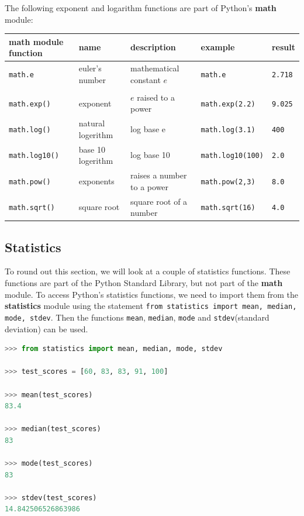 \documentclass{book}
\begin{document}
The following exponent and logarithm functions are part of Python's
\textbf{math} module:

\begin{longtable}[]{@{}lllll@{}}
\toprule
math module function & name & description & example &
result\tabularnewline
\midrule
\endhead
\lstinline!math.e! & euler's number & mathematical constant \(e\) &
\lstinline!math.e! & \lstinline!2.718!\tabularnewline
& & & &\tabularnewline
\lstinline!math.exp()! & exponent & \(e\) raised to a power &
\lstinline!math.exp(2.2)! & \lstinline!9.025!\tabularnewline
\lstinline!math.log()! & natural logerithm & log base e &
\lstinline!math.log(3.1)! & \lstinline!400!\tabularnewline
\lstinline!math.log10()! & base 10 logerithm & log base 10 &
\lstinline!math.log10(100)! & \lstinline!2.0!\tabularnewline
\lstinline!math.pow()! & exponents & raises a number to a power &
\lstinline!math.pow(2,3)! & \lstinline!8.0!\tabularnewline
\lstinline!math.sqrt()! & square root & square root of a number &
\lstinline!math.sqrt(16)! & \lstinline!4.0!\tabularnewline
\bottomrule
\end{longtable}
    




    
        \subsection{Statistics}\label{statistics}

To round out this section, we will look at a couple of statistics
functions. These functions are part of the Python Standard Library, but
not part of the \textbf{math} module. To access Python's statistics
functions, we need to import them from the \textbf{statistics} module
using the statement
\lstinline!from statistics import mean, median, mode, stdev!. Then the
functions \lstinline!mean!, \lstinline!median!, \lstinline!mode! and
\lstinline!stdev!(standard deviation) can be used.

\begin{lstlisting}[language=Python]
>>> from statistics import mean, median, mode, stdev
    
>>> test_scores = [60, 83, 83, 91, 100]
    
>>> mean(test_scores)
83.4

>>> median(test_scores)
83

>>> mode(test_scores)
83
    
>>> stdev(test_scores)
14.842506526863986 
\end{lstlisting}
\end{document}
